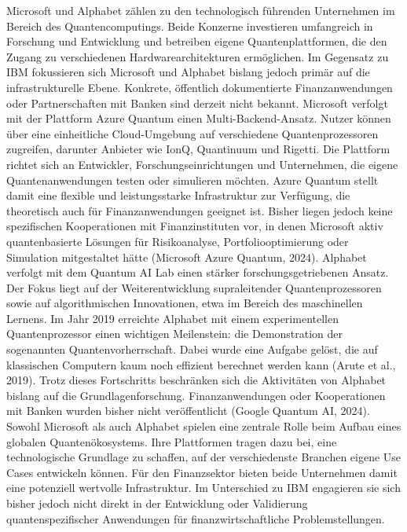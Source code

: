 Microsoft und Alphabet zählen zu den technologisch führenden Unternehmen im Bereich des Quantencomputings. Beide Konzerne investieren umfangreich in Forschung und Entwicklung und betreiben eigene Quantenplattformen, die den Zugang zu verschiedenen Hardwarearchitekturen ermöglichen. Im Gegensatz zu IBM fokussieren sich Microsoft und Alphabet bislang jedoch primär auf die infrastrukturelle Ebene. Konkrete, öffentlich dokumentierte Finanzanwendungen oder Partnerschaften mit Banken sind derzeit nicht bekannt.
Microsoft verfolgt mit der Plattform Azure Quantum einen Multi-Backend-Ansatz. Nutzer können über eine einheitliche Cloud-Umgebung auf verschiedene Quantenprozessoren zugreifen, darunter Anbieter wie IonQ, Quantinuum und Rigetti. Die Plattform richtet sich an Entwickler, Forschungseinrichtungen und Unternehmen, die eigene Quantenanwendungen testen oder simulieren möchten. Azure Quantum stellt damit eine flexible und leistungsstarke Infrastruktur zur Verfügung, die theoretisch auch für Finanzanwendungen geeignet ist. Bisher liegen jedoch keine spezifischen Kooperationen mit Finanzinstituten vor, in denen Microsoft aktiv quantenbasierte Lösungen für Risikoanalyse, Portfoliooptimierung oder Simulation mitgestaltet hätte (Microsoft Azure Quantum, 2024).
Alphabet verfolgt mit dem Quantum AI Lab einen stärker forschungsgetriebenen Ansatz. Der Fokus liegt auf der Weiterentwicklung supraleitender Quantenprozessoren sowie auf algorithmischen Innovationen, etwa im Bereich des maschinellen Lernens. Im Jahr 2019 erreichte Alphabet mit einem experimentellen Quantenprozessor einen wichtigen Meilenstein: die Demonstration der sogenannten Quantenvorherrschaft. Dabei wurde eine Aufgabe gelöst, die auf klassischen Computern kaum noch effizient berechnet werden kann (Arute et al., 2019). Trotz dieses Fortschritts beschränken sich die Aktivitäten von Alphabet bislang auf die Grundlagenforschung. Finanzanwendungen oder Kooperationen mit Banken wurden bisher nicht veröffentlicht (Google Quantum AI, 2024).
Sowohl Microsoft als auch Alphabet spielen eine zentrale Rolle beim Aufbau eines globalen Quantenökosystems. Ihre Plattformen tragen dazu bei, eine technologische Grundlage zu schaffen, auf der verschiedenste Branchen eigene Use Cases entwickeln können. Für den Finanzsektor bieten beide Unternehmen damit eine potenziell wertvolle Infrastruktur. Im Unterschied zu IBM engagieren sie sich bisher jedoch nicht direkt in der Entwicklung oder Validierung quantenspezifischer Anwendungen für finanzwirtschaftliche Problemstellungen.

